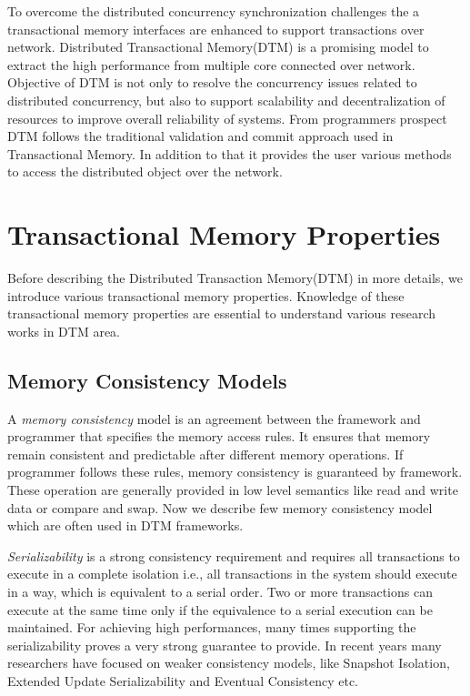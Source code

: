 \documentclass[12pt,english]{report}
\begin{document}
To overcome the distributed concurrency synchronization challenges the a transactional memory interfaces are enhanced to support transactions over network. Distributed Transactional Memory(DTM) is a promising model to extract the high performance from multiple core connected over network. Objective of DTM is not only to resolve the concurrency issues related to distributed concurrency, but also to support scalability and decentralization of resources to improve overall reliability of systems. From programmers prospect DTM follows the traditional validation and commit approach used in Transactional Memory. In addition to that it provides the user various methods to access the distributed object over the network. 

\section{Transactional Memory Properties}

Before describing the Distributed Transaction Memory(DTM) in more details, we introduce various transactional memory properties. Knowledge of these transactional memory properties are essential to understand various research works in DTM area.

\subsection{Memory Consistency Models}

A \textit{memory consistency} model is an agreement between the framework and programmer that specifies the memory access rules. It ensures that memory remain consistent and predictable after different memory operations. If programmer follows these rules, memory consistency is guaranteed by framework. These operation are generally provided in low level semantics like read and write data or compare and swap. Now we describe few memory consistency model which are often used in DTM frameworks.

\textit{Serializability} is a strong consistency requirement and requires all transactions to execute in a complete isolation i.e., all transactions in the system should execute in a way, which is equivalent to a serial order. Two or more transactions can execute at the same time only if the equivalence to a serial execution can be maintained. For achieving high performances, many times supporting the serializability proves a very strong guarantee to provide. In recent years many researchers have focused on weaker consistency models, like Snapshot Isolation, Extended Update Serializability and Eventual Consistency etc.
\end{document}
